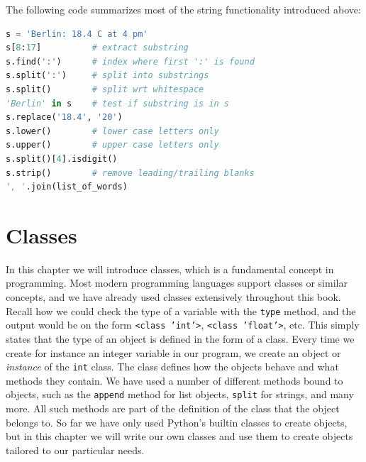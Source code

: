 \documentclass[graybox,envcountchap,sectrefs,final]{svmonodo}
\begin{document}
\noindent
The following code summarizes most of the string functionality introduced above:
\begin{lstlisting}[language=Python,style=blue1]
s = 'Berlin: 18.4 C at 4 pm'
s[8:17]          # extract substring
s.find(':')      # index where first ':' is found
s.split(':')     # split into substrings
s.split()        # split wrt whitespace
'Berlin' in s    # test if substring is in s
s.replace('18.4', '20')
s.lower()        # lower case letters only
s.upper()        # upper case letters only
s.split()[4].isdigit()
s.strip()        # remove leading/trailing blanks
', '.join(list_of_words)
\end{lstlisting}

\chapter{Classes}
\label{ch:classes}


In this chapter we will introduce classes, which is a fundamental concept in programming. Most modern
programming languages support classes or similar concepts, and we have already used classes extensively throughout this
book. Recall how we could check the type of a variable with the \texttt{type} method, and the output would be on the form
\texttt{<class 'int'>},  \texttt{<class 'float'>}, etc. This simply states that the type of an object is defined in the form of a class.
Every time we create for instance an integer variable in our program, we create an object or \emph{instance} of the \texttt{int} class.
The class defines how the objects behave and what methods they contain. We have used a number of different methods bound
to objects, such as the \texttt{append} method for list objects, \texttt{split} for strings, and many more. All such methods are
part of the definition of the class that the object belongs to. So far we have only used Python's builtin classes to create
objects, but in this chapter we will write our own classes and use them to create objects tailored to our particular needs.
\end{document}
